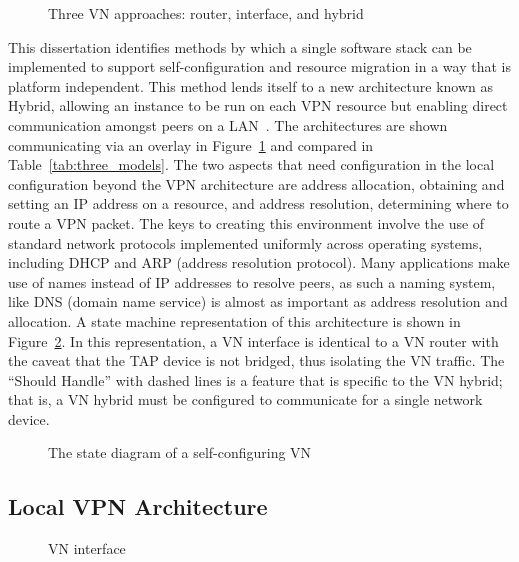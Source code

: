\begin{figure}
\centering
{}
\caption{Three VN approaches: router, interface, and hybrid}
\label{fig:three_models}
\end{figure}

This dissertation identifies methods by which a single software stack can be
implemented to support self-configuration and resource migration in a way that
is platform independent.  This method lends itself to a new architecture known
as Hybrid, allowing an instance to be run on each VPN resource but enabling
direct communication amongst peers on a LAN~\cite{sc09}.  The architectures are
shown communicating via an overlay in Figure~\ref{fig:three_models} and
compared in Table~\ref{tab:three_models}.  The two aspects that need
configuration in the local configuration beyond the VPN architecture are
address allocation, obtaining and setting an IP address on a resource, and
address resolution, determining where to route a VPN packet.  The keys to
creating this environment involve the use of standard network protocols
implemented uniformly across operating systems, including DHCP and ARP (address
resolution protocol).  Many applications make use of names instead of IP
addresses to resolve peers, as such a naming system, like DNS (domain name
service) is almost as important as address resolution and allocation.  A state
machine representation of this architecture is shown in Figure~\ref{fig:vn}.
In this representation, a VN interface is identical to a VN router with the
caveat that the TAP device is not bridged, thus isolating the VN traffic.  The
``Should Handle'' with dashed lines is a feature that is specific to the VN
hybrid; that is, a VN hybrid must be configured to communicate for a single
network device.

\begin{figure}[ht]
\centering
{}
\caption{The state diagram of a self-configuring VN}
\label{fig:vn}
\end{figure}

\subsection{Local VPN Architecture}

\begin{figure}
\centering
{}
\caption{VN interface}
\label{fig:interface}
\end{figure}

